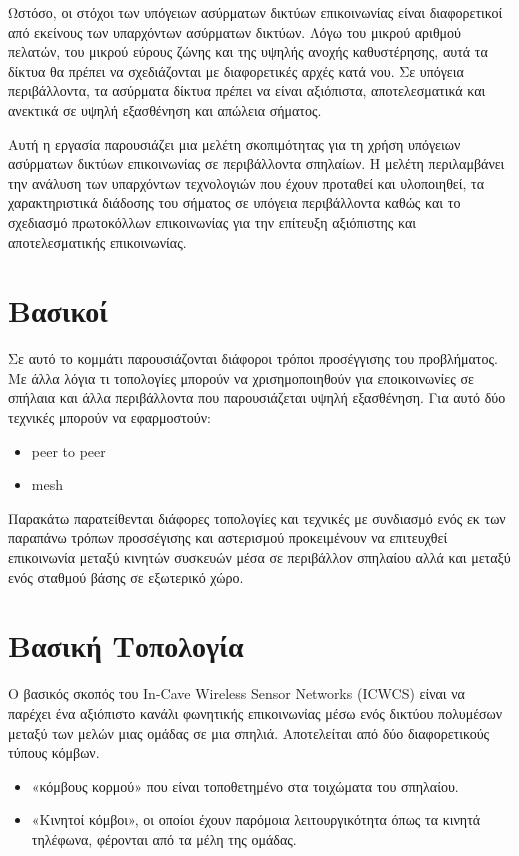 \documentclass[12pt]{article}
\begin{document}
\begin{multicols}{2}
        Ωστόσο, οι στόχοι των υπόγειων ασύρματων δικτύων επικοινωνίας είναι
        διαφορετικοί από εκείνους των υπαρχόντων ασύρματων δικτύων.
        Λόγω του μικρού αριθμού πελατών, του μικρού εύρους ζώνης και της
        υψηλής ανοχής καθυστέρησης, 
        αυτά τα δίκτυα θα πρέπει να σχεδιάζονται με διαφορετικές αρχές κατά νου. 
        Σε υπόγεια περιβάλλοντα, τα ασύρματα δίκτυα πρέπει να είναι αξιόπιστα,
        αποτελεσματικά και ανεκτικά σε υψηλή εξασθένηση και απώλεια σήματος.

        Αυτή η εργασία παρουσιάζει μια μελέτη σκοπιμότητας για τη χρήση 
        υπόγειων ασύρματων δικτύων επικοινωνίας σε περιβάλλοντα σπηλαίων. 
        Η μελέτη περιλαμβάνει την ανάλυση των υπαρχόντων τεχνολογιών που 
        έχουν προταθεί και υλοποιηθεί, τα χαρακτηριστικά διάδοσης του 
        σήματος σε υπόγεια περιβάλλοντα καθώς και το σχεδιασμό 
        πρωτοκόλλων επικοινωνίας για την επίτευξη αξιόπιστης και 
        αποτελεσματικής επικοινωνίας.

    \section{\normalsize \textsf{Βασικοί}}
    
        Σε αυτό το κομμάτι παρουσιάζονται διάφοροι τρόποι προσέγγισης του προβλήματος. 
        Με άλλα λόγια τι τοπολογίες μπορούν να χρισημοποιηθούν για εποικοινωνίες σε 
        σπήλαια και άλλα περιβάλλοντα που παρουσιάζεται υψηλή εξασθένηση.
    Για αυτό δύο τεχνικές μπορούν να εφαρμοστούν:
    \begin{itemize}
        \item peer to peer
        \item mesh
    \end{itemize}

    Παρακάτω παρατείθενται διάφορες τοπολογίες και τεχνικές με συνδιασμό ενός εκ των παραπάνω τρόπων προσσέγισης και αστερισμού προκειμένουν να επιτευχθεί επικοινωνία μεταξύ κινητών συσκευών μέσα σε περιβάλλον σπηλαίου αλλά και μεταξύ ενός σταθμού βάσης σε εξωτερικό χώρο.

    \section{\normalsize  \textsf{Βασική Τοπολογία}}
    Ο βασικός σκοπός του In-Cave Wireless Sensor Networks (ICWCS) είναι να παρέχει ένα αξιόπιστο κανάλι φωνητικής επικοινωνίας μέσω ενός δικτύου πολυμέσων μεταξύ των μελών
    μιας ομάδας σε μια σπηλιά. Αποτελείται από δύο διαφορετικούς τύπους κόμβων. 
    \begin{itemize}
        \item «κόμβους κορμού» που είναι τοποθετημένο στα τοιχώματα του σπηλαίου.
        \item «Κινητοί κόμβοι», οι οποίοι έχουν παρόμοια λειτουργικότητα όπως τα κινητά τηλέφωνα, φέρονται από τα μέλη της ομάδας.
    \end{itemize}


\end{multicols}
\end{document}
